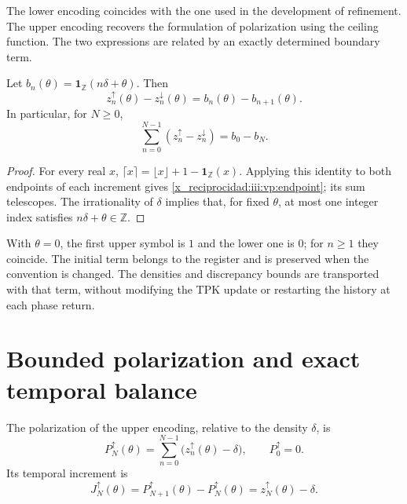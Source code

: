 The lower encoding coincides with the one used in the development
of refinement. The upper encoding recovers the formulation of
polarization using the ceiling function. The two expressions are related
by an exactly determined boundary term.

\begin{proposition}
Let $b_n(\theta)=\mathbf1_{\mathbb Z}(n\delta+\theta)$. Then
\begin{equation}
 z_n^{\uparrow}(\theta)-z_n^{\downarrow}(\theta)
 =b_n(\theta)-b_{n+1}(\theta).
 \label{x_reciprocidad:iii:vp:endpoint}
\end{equation}
In particular, for $N\geq0$,
\[
 \sum_{n=0}^{N-1}(z_n^{\uparrow}-z_n^{\downarrow})
 =b_0-b_N.
\]
\end{proposition}
\begin{proof}
For every real $x$, $\lceil x\rceil=\lfloor x\rfloor+1-
\mathbf1_{\mathbb Z}(x)$. Applying this identity to both endpoints
of each increment gives \eqref{x_reciprocidad:iii:vp:endpoint}; its sum telescopes.
The irrationality of $\delta$ implies that, for fixed $\theta$, at most
one integer index satisfies $n\delta+\theta\in\mathbb Z$.
\end{proof}

With $\theta=0$, the first upper symbol is $1$ and the lower one is $0$;
for $n\geq1$ they coincide. The initial term belongs to the register and is
preserved when the convention is changed. The densities and discrepancy
bounds are transported with that term, without modifying the TPK update
or restarting the history at each phase return.

\section{Bounded polarization and exact temporal balance}

\begin{definition}
The polarization of the upper encoding, relative to the density
$\delta$, is
\begin{equation}
 P_N^{\uparrow}(\theta)
 =\sum_{n=0}^{N-1}\bigl(z_n^{\uparrow}(\theta)-\delta\bigr),
 \qquad P_0^{\uparrow}=0.
 \label{x_reciprocidad:iii:vp:polarization}
\end{equation}
Its temporal increment is
\begin{equation}
 J_N^{\uparrow}(\theta)
 =P_{N+1}^{\uparrow}(\theta)-P_N^{\uparrow}(\theta)
 =z_N^{\uparrow}(\theta)-\delta.
 \label{x_reciprocidad:iii:vp:current}
\end{equation}
\end{definition}

